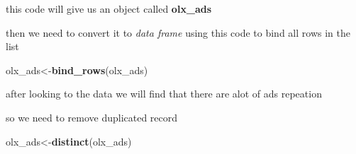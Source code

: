 \documentclass[]{article}
\newenvironment{Shaded}{\begin{snugshade}}{\end{snugshade}}
\newcommand{\KeywordTok}[1]{\textcolor[rgb]{0.13,0.29,0.53}{\textbf{#1}}}
\newcommand{\DataTypeTok}[1]{\textcolor[rgb]{0.13,0.29,0.53}{#1}}
\newcommand{\DecValTok}[1]{\textcolor[rgb]{0.00,0.00,0.81}{#1}}
\newcommand{\StringTok}[1]{\textcolor[rgb]{0.31,0.60,0.02}{#1}}
\newcommand{\ControlFlowTok}[1]{\textcolor[rgb]{0.13,0.29,0.53}{\textbf{#1}}}
\newcommand{\OperatorTok}[1]{\textcolor[rgb]{0.81,0.36,0.00}{\textbf{#1}}}
\newcommand{\NormalTok}[1]{#1}
\begin{document}
\begin{Shaded}
\end{Shaded}

this code will give us an object called \textbf{olx\_ads}

then we need to convert it to \emph{data frame} using this code to bind
all rows in the list

\begin{Shaded}
\begin{Highlighting}[]
\NormalTok{olx_ads<-}\KeywordTok{bind_rows}\NormalTok{(olx_ads)}
\end{Highlighting}
\end{Shaded}

after looking to the data we will find that there are alot of ads
repeation

so we need to remove duplicated record

\begin{Shaded}
\begin{Highlighting}[]
\NormalTok{olx_ads<-}\KeywordTok{distinct}\NormalTok{(olx_ads)}
\end{Highlighting}
\end{Shaded}
\end{document}

